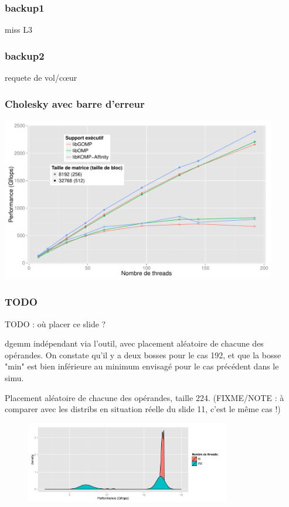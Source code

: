 \documentclass[xcolor={usenames,dvipsnames,svgnames,table}, aspectratio=43]{beamer}
\begin{document}
\begin{frame}
  \frametitle{backup1}

  miss L3

\end{frame}

\begin{frame}
  \frametitle{backup2}

  requete de vol/cœur

\end{frame}

\begin{frame}
  \frametitle{Cholesky avec barre d'erreur}

  \includegraphics[width=0.9\textwidth]{graph/graph_all_cholesky_idchire.pdf}

\end{frame}

\begin{frame}
\frametitle{TODO}

TODO : où placer ce slide ?

dgemm indépendant via l'outil, avec placement aléatoire de chacune des opérandes.
On constate qu'il y a deux bosses pour le cas 192, et que la bosse "min" est bien inférieure au minimum envisagé pour le cas précédent dans le simu.

Placement aléatoire de chacune des opérandes, taille 224.
(FIXME/NOTE : à comparer avec les distribs en situation réelle du slide 11, c'est le même cas !)

\begin{figure}
  \centering
  \includegraphics[width=0.8\textwidth]{graph/distrib_random_tool.pdf}
\end{figure}

\end{frame}
\end{document}

